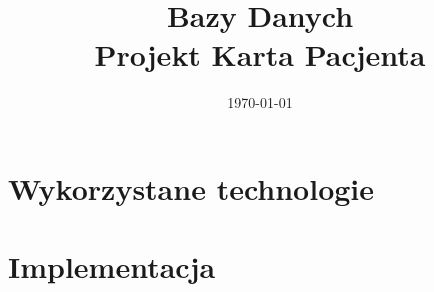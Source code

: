 \documentclass[12pt,a4paper]{article}
\begin{document}
\title{Bazy Danych\\Projekt Karta Pacjenta}
\date{\today}

\maketitle

\tableofcontents
\clearpage




\section{Wykorzystane technologie}


\section{Implementacja}



\end{document}
